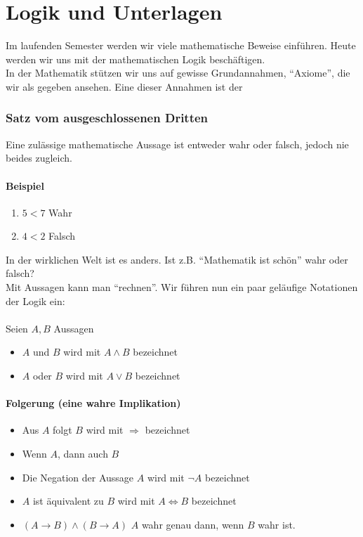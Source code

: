 \chapter{Logik und Unterlagen}
Im laufenden Semester werden wir viele mathematische Beweise einführen. Heute werden wir uns mit der mathematischen Logik beschäftigen. \\

In der Mathematik stützen wir uns auf gewisse Grundannahmen, ``Axiome'', die wir als gegeben ansehen. Eine dieser Annahmen ist der 
\subsection*{Satz vom ausgeschlossenen Dritten}
Eine zulässige mathematische Aussage ist entweder wahr oder falsch, jedoch nie beides zugleich.
\subsubsection*{Beispiel}
\begin{enumerate}
	\item $5<7$ Wahr
	\item $4<2$ Falsch
\end{enumerate}
In der wirklichen Welt ist es anders. Ist z.B. ``Mathematik ist schön'' wahr oder falsch?\\

Mit Aussagen kann man ``rechnen''. Wir führen nun ein paar geläufige Notationen der Logik ein:\\
\\
Seien $A,B$ Aussagen
\begin{itemize}
\item $A$ und $B$ wird mit $A\land B$ bezeichnet
\item $A$ oder $B$ wird mit $A\lor B$ bezeichnet
\end{itemize}
\subsubsection*{Folgerung (eine wahre Implikation)}
\begin{itemize}
\item Aus $A$ folgt $B$ wird mit $\Rightarrow$ bezeichnet
\item Wenn $A$, dann auch $B$
\item Die Negation der Aussage $A$ wird mit $\lnot A$ bezeichnet
\item $A$ ist äquivalent zu $B$ wird mit $A\Leftrightarrow B$ bezeichnet
\item $\left(A\to B\right)\land \left( B\to A\right)$ $A$ wahr genau dann, wenn $B$ wahr ist.
\end{itemize}

